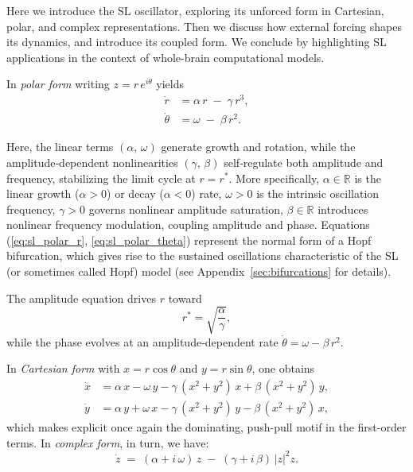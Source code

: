 \documentclass[12pt]{article}
\numberwithin{equation}{section}
\begin{document}
Here we introduce the SL oscillator, exploring its unforced form in Cartesian, polar, and complex representations. Then we discuss how external forcing shapes its dynamics, and introduce its coupled form. We conclude by highlighting SL applications in the context of whole-brain computational models. 

In \textit{polar form} writing \(z = r\,e^{i\theta}\) yields
\begin{align}
  \dot{r}      &= \alpha\,r \;-\; \gamma\,r^{3}, 
  \label{eq:sl_polar_r}\\
  \dot{\theta} &= \omega \;-\; \beta\,r^{2}.
  \label{eq:sl_polar_theta}
\end{align}

Here, the linear terms \((\alpha,\,\omega)\) generate growth and rotation, while the amplitude‐dependent nonlinearities \((\gamma,\,\beta)\) self‐regulate both amplitude and frequency, stabilizing the limit cycle at \(r=r^{*}\). More specifically, \(\alpha\in\mathbb{R}\) is the linear growth (\(\alpha>0\)) or decay (\(\alpha<0\)) rate, \(\omega>0\) is the intrinsic oscillation frequency, \(\gamma>0\) governs nonlinear amplitude saturation, \(\beta\in\mathbb{R}\) introduces nonlinear frequency modulation, coupling amplitude and phase. Equations (\eqref{eq:sl_polar_r}, \eqref{eq:sl_polar_theta}) represent the normal form of a Hopf bifurcation\cite{kuznecovElementsAppliedBifurcation1995}, which gives rise to the sustained oscillations characteristic of the SL (or sometimes called Hopf) model (see Appendix~\ref{sec:bifurcations} for details).

The amplitude equation drives \(r\) toward
\begin{equation}
  r^{*} = \sqrt{\frac{\alpha}{\gamma}},
\end{equation}
while the phase evolves at an amplitude‐dependent rate \( \dot\theta = \omega - \beta\,r^{2}\).

In \textit{Cartesian form}
with \(x = r\cos\theta\) and \(y = r\sin\theta\), one obtains
\begin{align}
  \dot{x} &= \alpha\,x - \omega\,y
           - \gamma\,(x^{2}+y^{2})\,x
           + \beta\,(x^{2}+y^{2})\,y,
  \label{eq:sl_cart_x}\\
  \dot{y} &= \alpha\,y + \omega\,x
           - \gamma\,(x^{2}+y^{2})\,y
           - \beta\,(x^{2}+y^{2})\,x,
  \label{eq:sl_cart_y}
\end{align}
which makes explicit once again the dominating,  push-pull motif in the first-order terms.
In \textit{complex form}, in turn, we have:
\begin{equation}
\dot{z} \;=\; (\alpha + i\,\omega)\,z \;-\; (\gamma + i\,\beta)\,\lvert z\rvert^{2}z.
\end{equation}
\end{document}
